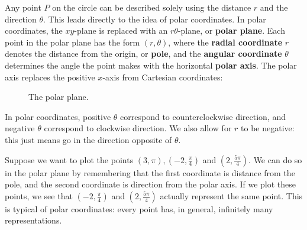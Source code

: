 \documentclass[10pt,]{book}
\newcommand{\terminology}[1]{\textbf{#1}}
\theoremstyle{ptxplainnotitle}
\theoremstyle{ptxplaintitle}
\theoremstyle{ptxplainnotitle}
\theoremstyle{ptxplaintitle}
\theoremstyle{ptxplainnotitle}
\theoremstyle{ptxplaintitle}
\theoremstyle{ptxdefinitionnotitle}
\theoremstyle{ptxdefinitiontitle}
\theoremstyle{ptxdefinitionnotitle}
\theoremstyle{ptxdefinitiontitle}
\theoremstyle{ptxdefinitionnotitle}
\theoremstyle{ptxdefinitiontitle}
\theoremstyle{ptxdefinitionnotitle}
\theoremstyle{ptxdefinitiontitle}
\theoremstyle{ptxdefinitionnotitle}
\theoremstyle{ptxdefinitiontitle}
\numberwithin{equation}{section}
\begin{document}
\hypertarget{p-673}{}%
Any point \(P\) on the circle can be described solely using the distance \(r\) and the direction \(\theta\). This leads directly to the idea of polar coordinates. In polar coordinates, the \(xy\)-plane is replaced with an \(r\theta\)-plane, or \terminology{polar plane}. Each point in the polar plane has the form \((r,\theta)\), where the \terminology{radial coordinate} \(r\) denotes the distance from the origin, or \terminology{pole}, and the \terminology{angular coordinate} \(\theta\) determines the angle the point makes with the horizontal \terminology{polar axis}. The polar axis replaces the positive \(x\)-axis from Cartesian coordinates:%
\begin{figure}
\centering
{
}
\caption{The polar plane.\label{figure-polar-plane}}
\end{figure}
\hypertarget{p-674}{}%
In polar coordinates, positive \(\theta\) correspond to counterclockwise direction, and negative \(\theta\) correspond to clockwise direction. We also allow for \(r\) to be negative: this just means go in the direction opposite of \(\theta\).%
\begin{example}\label{example-plotting-polar-coordinates}
\hypertarget{p-675}{}%
Suppose we want to plot the points \((3,\pi), (-2,\frac{\pi}{4})\) and \((2,\frac{5\pi}{4}).\) We can do so in the polar plane by remembering that the first coordinate is distance from the pole, and the second coordinate is direction from the polar axis. If we plot these points, we see that \((-2,\frac{\pi}{4})\) and \((2,\frac{5\pi}{4})\) actually represent the same point. This is typical of polar coordinates: every point has, in general, infinitely many representations.%
\end{example}
\end{document}
